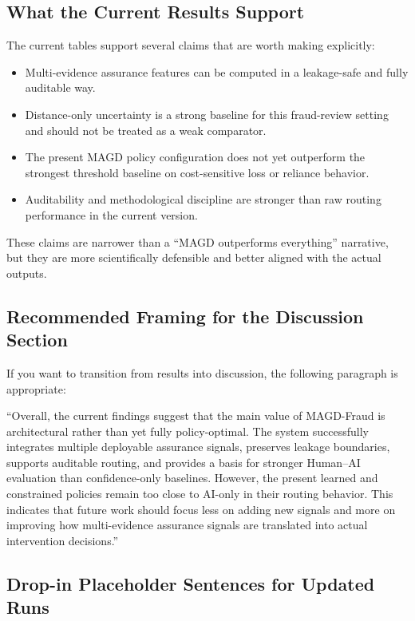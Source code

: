 \subsection{What the Current Results Support}
\label{subsec:results_claims_supported}

The current tables support several claims that are worth making explicitly:
\begin{itemize}
\item Multi-evidence assurance features can be computed in a leakage-safe and fully auditable way.
\item Distance-only uncertainty is a strong baseline for this fraud-review setting and should not be treated as a weak comparator.
\item The present MAGD policy configuration does not yet outperform the strongest threshold baseline on cost-sensitive loss or reliance behavior.
\item Auditability and methodological discipline are stronger than raw routing performance in the current version.
\end{itemize}

These claims are narrower than a ``MAGD outperforms everything'' narrative, but they are more scientifically defensible and better aligned with the actual outputs.

\subsection{Recommended Framing for the Discussion Section}
\label{subsec:results_discussion_bridge}

If you want to transition from results into discussion, the following paragraph is appropriate:

``Overall, the current findings suggest that the main value of MAGD-Fraud is architectural rather than yet fully policy-optimal. The system successfully integrates multiple deployable assurance signals, preserves leakage boundaries, supports auditable routing, and provides a basis for stronger Human--AI evaluation than confidence-only baselines. However, the present learned and constrained policies remain too close to AI-only in their routing behavior. This indicates that future work should focus less on adding new signals and more on improving how multi-evidence assurance signals are translated into actual intervention decisions.''

\subsection{Drop-in Placeholder Sentences for Updated Runs}
\label{subsec:results_placeholders}


